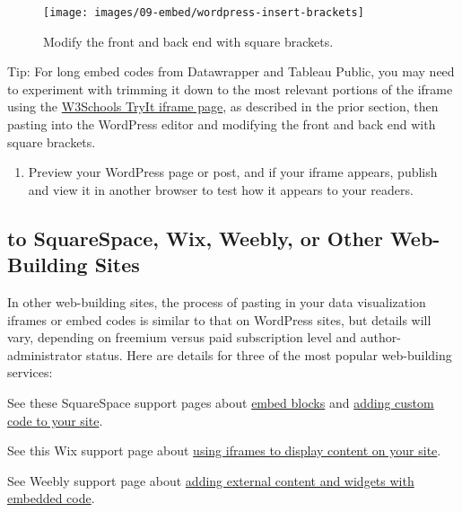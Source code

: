 \documentclass[
  english,
]{book}
\providecommand{\tightlist}{%
  \setlength{\itemsep}{0pt}\setlength{\parskip}{0pt}}
\begin{document}
\begin{figure}
\texttt{[image: images/09-embed/wordpress-insert-brackets]} \caption{Modify the front and back end with square brackets.}\label{fig:wordpress-insert-brackets}
\end{figure}

Tip: For long embed codes from Datawrapper and Tableau Public, you may need to experiment with trimming it down to the most relevant portions of the iframe using the \href{https://www.w3schools.com/tags/tryit.asp?filename=tryhtml_iframe}{W3Schools TryIt iframe page}, as described in the prior section, then pasting into the WordPress editor and modifying the front and back end with square brackets.

\begin{enumerate}
\def\labelenumi{\arabic{enumi}.}
\setcounter{enumi}{3}
\tightlist
\item
  Preview your WordPress page or post, and if your iframe appears, publish and view it in another browser to test how it appears to your readers.
\end{enumerate}

\hypertarget{to-squarespace-wix-weebly-or-other-web-building-sites}{%
\subsection*{to SquareSpace, Wix, Weebly, or Other Web-Building Sites}\label{to-squarespace-wix-weebly-or-other-web-building-sites}}

In other web-building sites, the process of pasting in your data visualization iframes or embed codes is similar to that on WordPress sites, but details will vary, depending on freemium versus paid subscription level and author-administrator status. Here are details for three of the most popular web-building services:

See these SquareSpace support pages about \href{https://support.squarespace.com/hc/en-us/articles/206543617-Embed-Blocks}{embed blocks} and \href{https://support.squarespace.com/hc/en-us/articles/205815928-Adding-custom-code-to-your-site\#toc-code-blocks-vs--embed-blocks}{adding custom code to your site}.

See this Wix support page about \href{https://support.wix.com/en/article/wix-editor-using-iframes-to-display-visible-content-on-your-site}{using iframes to display content on your site}.

See Weebly support page about \href{https://www.weebly.com/app/help/us/en/topics/create-widgets-embed-code-and-add-external-content}{adding external content and widgets with embedded code}.
\end{document}
